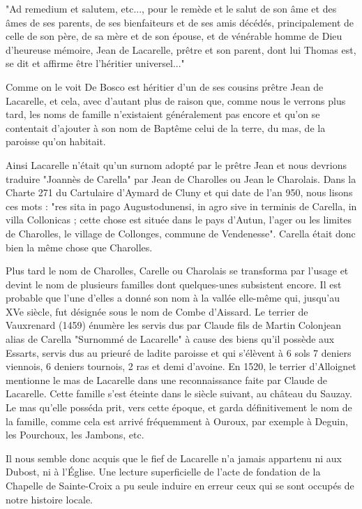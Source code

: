 "Ad remedium et salutem, etc..., pour le remède et le salut de son âme et des âmes de ses parents, de ses bienfaiteurs et de ses amis décédés, principalement de celle de son père, de sa mère et de son épouse, et de vénérable homme de Dieu d'heureuse mémoire, Jean de Lacarelle, prêtre et son parent, dont lui Thomas est, se dit et affirme être l'héritier universel..."

Comme on le voit De Bosco est héritier d'un de ses cousins prêtre Jean de Lacarelle, et cela, avec d'autant plus de raison que, comme nous le verrons plus tard, les noms de famille n'existaient généralement pas encore et qu'on se contentait d'ajouter à son nom de Baptême celui de la terre, du mas, de la paroisse qu'on habitait.

Ainsi Lacarelle n'était qu'un surnom adopté par le prêtre Jean et nous devrions traduire "Joannès de Carella" par Jean de Charolles ou Jean le Charolais. Dans la Charte 271 du Cartulaire d'Aymard de Cluny et qui date de l'an 950, nous lisons ces mots : "res sita in pago Augustodunensi, in agro sive in terminis de Carella, in villa Collonicas ; cette chose est située dans le pays d'Autun, l'ager ou les limites de Charolles, le village de Collonges, commune de Vendenesse". Carella était donc bien la même chose que Charolles.

Plus tard le nom de Charolles, Carelle ou Charolais se transforma par l'usage et devint le nom de plusieurs familles dont quelques-unes subsistent encore. Il est probable que l'une d'elles a donné son nom à la vallée elle-même qui, jusqu'au XVe siècle, fut désignée sous le nom de Combe d'Aissard. Le terrier de Vauxrenard (1459) énumère les servis dus par Claude fils de Martin Colonjean alias de Carella "Surnommé de Lacarelle" à cause des biens qu'il possède aux Essarts, servis dus au prieuré de ladite paroisse et qui s'élèvent à 6 sols 7 deniers viennois, 6 deniers tournois, 2 ras et demi d'avoine. En 1520, le terrier d'Alloignet mentionne le mas de Lacarelle dans une reconnaissance faite par Claude de Lacarelle. Cette famille s'est éteinte dans le siècle suivant, au château du Sauzay. Le mas qu'elle posséda prit, vers cette époque, et garda définitivement le nom de la famille, comme cela est arrivé fréquemment à Ouroux, par exemple à Deguin, les Pourchoux, les Jambons, etc.

Il nous semble donc acquis que le fief de Lacarelle n'a jamais appartenu ni aux Dubost, ni à l'Église. Une lecture superficielle de l'acte de fondation de la Chapelle de Sainte-Croix a pu seule induire en erreur ceux qui se sont occupés de notre histoire locale.

